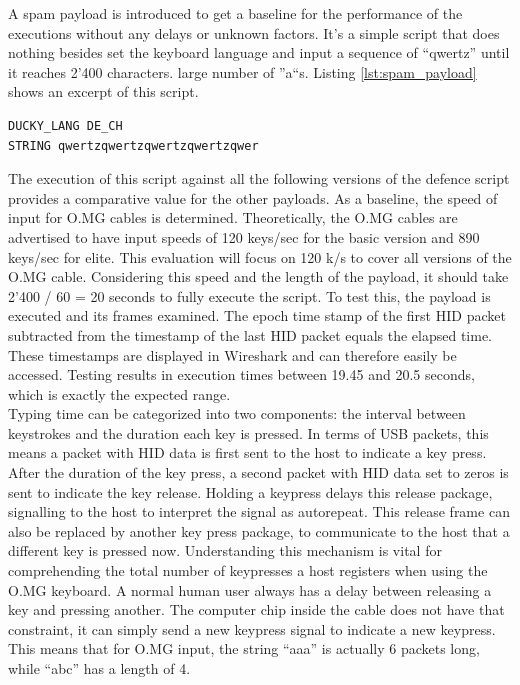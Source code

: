 A spam payload is introduced to get a baseline for the performance of the executions without any delays or unknown factors. It's a simple script that does nothing besides set the keyboard language and input a sequence of ``qwertz'' until it reaches 2’400 characters.  large number of ''a``s. Listing \ref{lst:spam_payload} shows an excerpt of this script. 


\begin{lstlisting}[caption={Excerpt: write a string of length 2'400 without delays},label=lst:spam_payload, captionpos=b]
DUCKY_LANG DE_CH
STRING qwertzqwertzqwertzqwertzqwer
\end{lstlisting}

The execution of this script against all the following versions of the defence script provides a comparative value for the other payloads.
As a baseline, the speed of input for O.MG cables is determined. Theoretically, the O.MG cables are advertised to have input speeds of 120 keys/sec for the basic version and 890 keys/sec for elite. This evaluation will focus on 120 k/s to cover all versions of the O.MG cable. Considering this speed and the length of the payload, it should take 2'400 / 60 = 20 seconds to fully execute the script. To test this, the payload is executed and its frames examined. The epoch time stamp of the first HID packet subtracted from the timestamp of the last HID packet equals the elapsed time. These timestamps are displayed in Wireshark and can therefore easily be accessed. Testing results in execution times between 19.45 and 20.5 seconds, which is exactly the expected range. \\
Typing time can be categorized into two components: the interval between keystrokes and the duration each key is pressed. In terms of USB packets, this means a packet with HID data is first sent to the host to indicate a key press. After the duration of the key press, a second packet with HID data set to zeros is sent to indicate the key release. Holding a keypress delays this release package, signalling to the host to interpret the signal as autorepeat. This release frame can also be replaced by another key press package, to communicate to the host that a different key is pressed now. Understanding this mechanism is vital for comprehending the total number of keypresses a host registers when using the O.MG keyboard. A normal human user always has a delay between releasing a key and pressing another. The computer chip inside the cable does not have that constraint, it can simply send a new keypress signal to indicate a new keypress. This means that for O.MG input, the string ``aaa'' is actually 6 packets long, while ``abc'' has a length of 4. 

